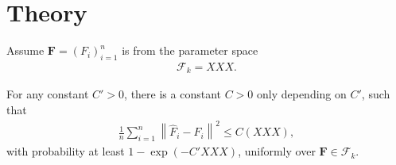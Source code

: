 

\section{Theory} \label{sec:theory}

Assume $ \mathbf{F}=\left( F_i \right)_{i=1}^n$ is from the parameter space
\begin{align*}
\mathcal F_k = XXX.
\end{align*}


\begin{thm}
For any constant $C'>0$, there is a constant $C>0$ only depending on $C'$, such that
\begin{align*}
\frac{1}{n}\sum_{i=1}^n \left\| \hat F_i - F_i \right\|^2\leq C \left( XXX \right)  ,
\end{align*}
with probability at least $1-\exp \left( -C' XXX \right)  $, uniformly over $\mathbf{F}\in \mathcal F_k$.

\end{thm}

